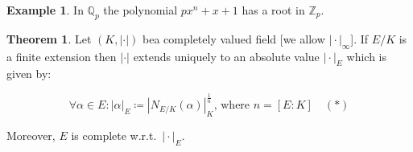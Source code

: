 \documentclass[openany]{amsbook}
\numberwithin{section}{chapter}
\theoremstyle{definition}
\newtheorem*{example}{Example}
\newtheorem{theorem}{Theorem}[chapter]
\begin{document}
\begin{example}
    In \(\mathbb{Q}_p\) the polynomial \(p x^n + x + 1\) has a root in \(\mathbb{Z}_p\).
\end{example}

\begin{theorem}
    Let \((K,\vert \cdot \vert)\) bea completely valued field [we allow \(\vert \cdot \vert_\infty\)]. If \(E / K\) is a finite extension then \(\vert \cdot \vert \) extends uniquely to an absolute value \(\vert \cdot \vert _E\) which is given by:

    \[
        \forall \alpha \in E: \vert \alpha \vert _E \coloneqq \left\vert N_{E / K} (\alpha) \right\vert _K ^{\frac{1}{n}}, \, \text{where } n = [E:K] \quad (\ast)
    \]

    Moreover, \(E\) is complete w.r.t.\ \(\vert \cdot \vert _E\).
\end{theorem}
\end{document}
